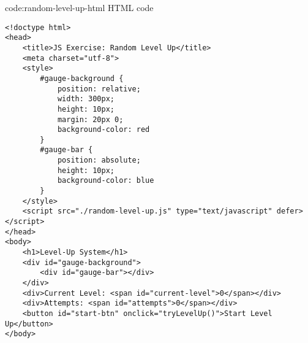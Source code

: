 \begin{codeenv}{code:random-level-up-html}{ HTML code}
\begin{verbatim}
<!doctype html>
<head>
    <title>JS Exercise: Random Level Up</title>
    <meta charset="utf-8">
    <style>
        #gauge-background {
            position: relative;
            width: 300px;
            height: 10px;
            margin: 20px 0;
            background-color: red
        }
        #gauge-bar {
            position: absolute;
            height: 10px;
            background-color: blue
        }
    </style>
    <script src="./random-level-up.js" type="text/javascript" defer></script>
</head>
<body>
    <h1>Level-Up System</h1>
    <div id="gauge-background">
        <div id="gauge-bar"></div>
    </div>
    <div>Current Level: <span id="current-level">0</span></div>
    <div>Attempts: <span id="attempts">0</span></div>
    <button id="start-btn" onclick="tryLevelUp()">Start Level Up</button>
</body>
\end{verbatim}
\end{codeenv}

